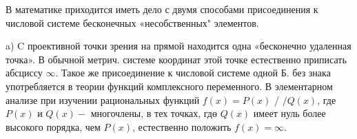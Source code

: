 \documentclass[10pt]{article}
\begin{document}
В математике приходится иметь дело с двумя способами присоединения к числовой системе бесконечных «несобственных" элементов.



a) C проективной точки зрения на прямой находится одна «бесконечно удаленная точка». В обычной метрич. системе координат этой точке естественно приписать абсциссу $\infty$. Такое же присоединение к числовой системе одной Б. без знака употребляется в теории функций комплексного переменного. В элементарном анализе при изучении рациональных функций $f(x)=P(x)$ / $/ Q(x)$, где $P(x)$ и $Q(x)-$ многочлены, в тех точках, гдө $Q(x)$ имеет нуль более высокого порядка, чем $P(x)$, естественно положить $f(x)=\infty$.
\end{document}
